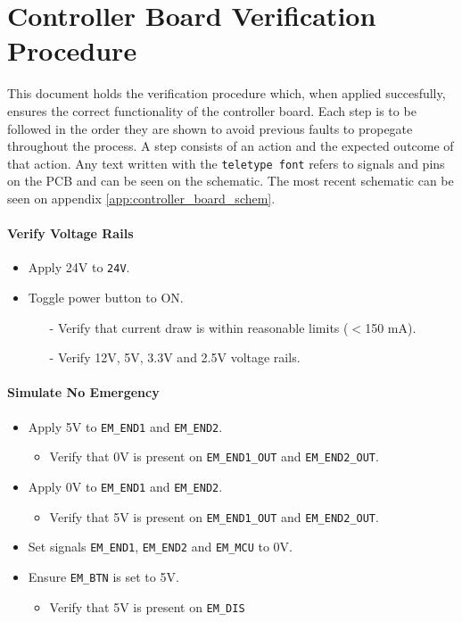 \section{Controller Board Verification Procedure} %
\label{sec:controller_board_verification_procedure}
This document holds the verification procedure which, when applied succesfully, ensures the correct functionality of the controller board.
Each step is to be followed in the order they are shown to avoid previous faults to propegate throughout the process.
A step consists of an action and the expected outcome of that action.
Any text written with the \texttt{teletype font} refers to signals and pins on the PCB and can be seen on the schematic.
The most recent schematic can be seen on appendix \ref{app:controller_board_schem}.
\paragraph{Verify Voltage Rails} %
 \label{par:verify_voltage_rails}
 \begin{itemize}
 	\item Apply 24V to \texttt{24V}.
 	\item Toggle power button to ON.
 	\begin{itemize}
 		\item[-] Verify that current draw is within reasonable limits ($<$150 mA).
 		\item[-] Verify 12V, 5V, 3.3V and 2.5V voltage rails.
 	\end{itemize}
 \end{itemize}

\paragraph{Simulate No Emergency} %
\label{par:simulate_no_emergency}
\begin{itemize}
	\item Apply 5V to \texttt{EM\_END1} and \texttt{EM\_END2}.
	\begin{itemize}
		\item Verify that 0V is present on \texttt{EM\_END1\_OUT} and \texttt{EM\_END2\_OUT}.
	\end{itemize}
	\item Apply 0V to \texttt{EM\_END1} and \texttt{EM\_END2}.
	\begin{itemize}
		\item Verify that 5V is present on \texttt{EM\_END1\_OUT} and \texttt{EM\_END2\_OUT}.
	\end{itemize}
	\item Set signals \texttt{EM\_END1}, \texttt{EM\_END2} and \texttt{EM\_MCU} to 0V.
	\item Ensure \texttt{EM\_BTN} is set to 5V.
	\begin{itemize}
		\item Verify that 5V is present on \texttt{EM\_DIS}
	\end{itemize}
\end{itemize}
